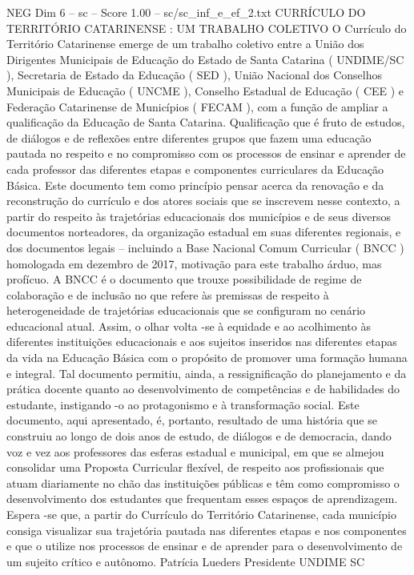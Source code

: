 \begin{textsample}{NEG Dim 6 – sc – Score 1.00 – sc/sc\_inf\_e\_ef\_2.txt}  \label{ex:f6_neg_271}
CURRÍCULO DO TERRITÓRIO CATARINENSE : UM TRABALHO COLETIVO O Currículo do Território Catarinense emerge de um trabalho coletivo entre a União dos Dirigentes Municipais de Educação do Estado de Santa Catarina ( UNDIME/SC ), Secretaria de Estado da Educação ( SED ), União Nacional dos Conselhos Municipais de Educação ( UNCME ), Conselho Estadual de Educação ( CEE ) e Federação Catarinense de Municípios ( FECAM ), com a função de ampliar a qualificação da Educação de Santa Catarina.
Qualificação que é fruto de estudos, de diálogos e de reflexões entre diferentes grupos que fazem uma educação pautada no respeito e no compromisso com os processos de ensinar e aprender de cada professor das diferentes etapas e componentes curriculares da Educação Básica.
Este documento tem como princípio pensar acerca da renovação e da reconstrução do currículo e dos atores sociais que se inscrevem nesse contexto, a partir do respeito às trajetórias educacionais dos municípios e de seus diversos documentos norteadores, da organização estadual em suas diferentes regionais, e dos documentos legais – incluindo a Base Nacional Comum Curricular ( BNCC ) homologada em dezembro de 2017, motivação para este trabalho árduo, mas profícuo.
A BNCC é o documento que trouxe possibilidade de regime de colaboração e de inclusão no que refere às premissas de respeito à heterogeneidade de trajetórias educacionais que se configuram no cenário educacional atual.
Assim, o olhar volta -se à equidade e ao acolhimento às diferentes instituições educacionais e aos sujeitos inseridos nas diferentes etapas da vida na Educação Básica com o propósito de promover uma formação humana e integral.
Tal documento permitiu, ainda, a ressignificação do planejamento e da prática docente quanto ao desenvolvimento de competências e de habilidades do estudante, instigando -o ao protagonismo e à transformação social.
Este documento, aqui apresentado, é, portanto, resultado de uma história que se construiu ao longo de dois anos de estudo, de diálogos e de democracia, dando voz e vez aos professores das esferas estadual e municipal, em que se almejou consolidar uma Proposta Curricular flexível, de respeito aos profissionais que atuam diariamente no chão das instituições públicas e têm como compromisso o desenvolvimento dos estudantes que frequentam esses espaços de aprendizagem.
Espera -se que, a partir do Currículo do Território Catarinense, cada município consiga visualizar sua trajetória pautada nas diferentes etapas e nos componentes e que o utilize nos processos de ensinar e de aprender para o desenvolvimento de um sujeito crítico e autônomo.
Patrícia Lueders Presidente UNDIME SC

\end{textsample}
